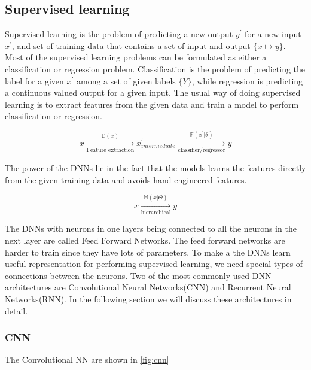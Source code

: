 \documentclass[a4paper]{article}
\begin{document}
\subsection{Supervised  learning}   Supervised  learning   is   the  problem  of
predicting a new output $y^\prime$ for a new  input $x^\prime$,
and set of training  data that contains a  set of  input and output $\{x \mapsto
y\}$. Most of the supervised learning problems  can be  formulated  as either  a
classification   or  regression   problem.  Classification  is  the  problem  of
predicting the  label for a given $x^\prime$ among a set of given labels
$\{Y\}$,  while regression  is predicting a continuous valued output for a given
input. The usual way  of doing supervised learning  is to extract features from
the given data and train a model to perform classification or regression.


\begin{equation*}
  x
  \xrightarrow[\text{Feature extraction}]{
    \mathbb{D}(x)
  }
  x^\prime
  _{intermediate}
  \xrightarrow[\text{classifier/regressor}]{
    \mathbb{F}(x^\prime | \theta)
  }
  y
\end{equation*}


The  power of the  DNNs lie in  the fact  that the  models learns  the  features
directly from the given training data and avoids hand  engineered features.


\begin{equation*}
  x \xrightarrow[ \text{hierarchical}] { \mathbb{M}(x | \Theta) } y
\end{equation*}


The DNNs  with neurons in one  layers being connected to all the neurons  in the
next  layer  are  called  Feed Forward Networks. The feed  forward networks  are
harder  to train since  they have lots  of parameters. To make  a the DNNs learn
useful representation for performing supervised learning,  we need special types
of  connections  between  the  neurons.  Two  of  the  most  commonly  used  DNN
architectures  are  Convolutional  Neural  Networks(CNN)  and  Recurrent  Neural
Networks(RNN). In the following section  we  will discuss these architectures in
detail.


\subsubsection{CNN}
The Convolutional NN are shown in \ref{fig:cnn}
\end{document}
